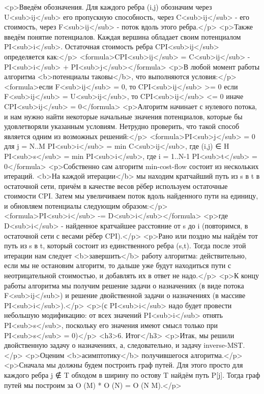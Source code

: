 <p>Введём обозначения. Для каждого ребра (i,j) обозначим через U<sub>ij</sub> его пропускную способность, через C<sub>ij</sub> - его стоимость, через F<sub>ij</sub> - поток вдоль этого ребра.</p>
<p>Также введём понятие потенциалов. Каждая вершина обладает своим потенциалом PI<sub>i</sub>. Остаточная стоимость ребра CPI<sub>ij</sub> определяется как:</p>
<formula>CPI<sub>ij</sub> = C<sub>ij</sub> - PI<sub>i</sub> + PI<sub>j</sub></formula>
<p>В любой момент работы алгоритма <b>потенциалы таковы</b>, что выполняются условия:</p>
<formula>если F<sub>ij</sub> = 0, то CPI<sub>ij</sub> >= 0
если F<sub>ij</sub> = U<sub>ij</sub>, то CPI<sub>ij</sub> <= 0
иначе CPI<sub>ij</sub> = 0</formula>
<p>Алгоритм начинает с нулевого потока, и нам нужно найти некоторые начальные значения потенциалов, которые бы удовлетворяли указанным условиям. Нетрудно проверить, что такой способ является одним из возможных решений:</p>
<formula>PI<sub>j</sub> = 0   для j = N..M
PI<sub>i</sub> = min C<sub>ij</sub>, где (i,j) ∈ H
PI<sub>s</sub> = min PI<sub>i</sub>, где i = 1..N-1
PI<sub>t</sub> = 0</formula>
<p>Собственно сам алгоритм min-cost-flow состоит из нескольких итераций. <b>На каждой итерации</b> мы находим кратчайший путь из s в t в остаточной сети, причём в качестве весов рёбер используем остаточные стоимости CPI. Затем мы увеличиваем поток вдоль найденного пути на единицу, и обновляем потенциалы следующим образом:</p>
<formula>PI<sub>i</sub> -= D<sub>i</sub></formula>
<p>где D<sub>i</sub> - найденное кратчайшее расстояние от s до i (повторимся, в остаточной сети с весами рёбер CPI).</p>
<p>Рано или поздно мы найдём тот путь из s в t, который состоит из единственного ребра (s,t). Тогда после этой итерации нам следует <b>завершить</b> работу алгоритма: действительно, если мы не остановим алгоритм, то дальше уже будут находиться пути с неотрицательной стоимостью, и добавлять их в ответ не надо.</p>
<p>К концу работы алгоритма мы получим решение задачи о назначениях (в виде потока F<sub>ij</sub>) и решение двойственной задачи о назначениях (в массиве PI<sub>i</sub>).</p>
<p>(с PI<sub>i</sub> надо будет провести небольшую модификацию: от всех значений PI<sub>i</sub> отнять PI<sub>s</sub>, поскольку его значения имеют смысл только при PI<sub>s</sub> = 0)</p>
<h3>6. Итог</h3>
<p>Итак, мы решили двойственную задачу о назначениях, а, следовательно, и задачу inverse-MST.</p>
<p>Оценим <b>асимптотику</b> получившегося алгоритма.</p>
<p>Сначала мы должны будем построить граф путей. Для этого просто для каждого ребра j ∉ T обходом в ширину по остову T найдём путь P[j]. Тогда граф путей мы построим за O (M) * O (N) = O (N M).</p>
